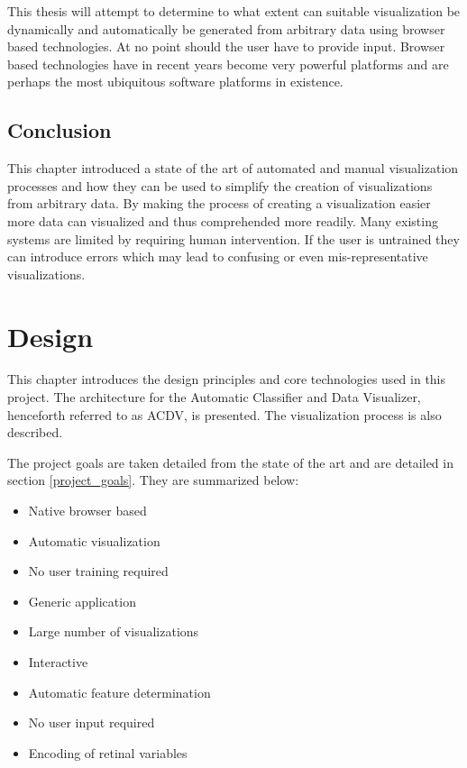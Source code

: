 \documentclass[a4paper, 11pt, titlepage, onehalfspacing]{report}
\begin{document}
This thesis will attempt to determine to what extent can suitable visualization be dynamically and automatically be generated from arbitrary data using browser based technologies. At no point should the user have to provide input. Browser based technologies have in recent years become very powerful platforms and are perhaps the most ubiquitous software platforms in existence. 

\section{Conclusion}
This chapter introduced a state of the art of automated and manual visualization processes and how they can be used to simplify the creation of visualizations from arbitrary data. By making the process of creating a visualization easier more data can visualized and thus comprehended more readily. Many existing systems are limited by requiring human intervention. If the user is untrained they can introduce errors which may lead to confusing or even mis-representative visualizations. 


 

\chapter{Design}
This chapter introduces the design principles and core technologies used in this project. The architecture for the Automatic Classifier and Data Visualizer, henceforth referred to as AC\lightning{}DV, is presented. The visualization process is also described.

The project goals are taken detailed from the state of the art and are detailed in section \ref{project_goals}. They are summarized below:

\begin{itemize}
\item Native browser based
\item Automatic visualization
\item No user training required
\item Generic application
\item Large number of visualizations
\item Interactive
\item Automatic feature determination
\item No user input required 
\item Encoding of retinal variables
\end{itemize}
\end{document}
